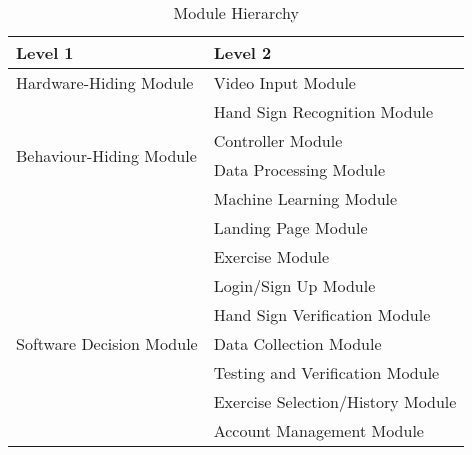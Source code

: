 \documentclass[12pt, titlepage]{article}
\begin{document}
\begin{table}[h!]
\centering
\begin{tabular}{p{} p{}}
\toprule
\textbf{Level 1} & \textbf{Level 2}\\
\midrule

\multirow{1}{0.3\textwidth}{Hardware-Hiding Module} 
& Video Input Module\\
\midrule

\multirow{4}{0.3\textwidth}{Behaviour-Hiding Module} 
& Hand Sign Recognition Module\\
& Controller Module \\
& Data Processing Module \\
& Machine Learning Module \\
& Landing Page Module \\
& Exercise Module \\
& Login/Sign Up Module \\
\midrule

\multirow{3}{0.3\textwidth}{Software Decision Module} 
& Hand Sign Verification Module \\
& Data Collection Module \\
& Testing and Verification Module \\
& Exercise Selection/History Module \\
& Account Management Module \\
\bottomrule

\end{tabular}
\caption{Module Hierarchy}
\label{TblMH}
\end{table}

\newpage





\end{document}

